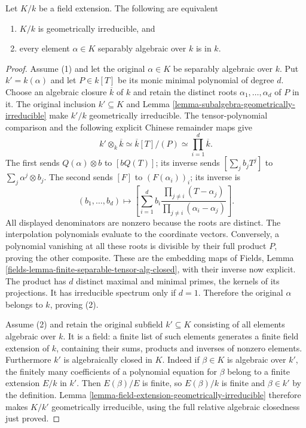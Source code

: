 \begin{lemma}
\label{lemma-geometrically-irreducible-separable-elements}
Let $K/k$ be a field extension. The following are equivalent
\begin{enumerate}
\item $K/k$ is geometrically irreducible, and
\item every element $\alpha \in K$ separably algebraic over $k$ is
in $k$.
\end{enumerate}
\end{lemma}

\begin{proof}
Assume (1) and let the original
$\alpha\in K$ be separably algebraic
over $k$. Put $k'=k(\alpha)$ and
let $P\in k[T]$ be its monic
minimal polynomial of degree $d$.
Choose an algebraic closure
$\overline k$ of $k$ and retain
the distinct roots
$\alpha_1,\ldots,\alpha_d$ of $P$
in it. The original inclusion
$k'\subseteq K$ and Lemma
\ref{lemma-subalgebra-geometrically-irreducible}
make $k'/k$ geometrically irreducible.
The tensor-polynomial comparison
and the following explicit Chinese
remainder maps give
$$
k'\otimes_k\overline k\simeq
\overline k[T]/(P)\simeq\prod_{i=1}^d\overline k.
$$
The first sends $Q(\alpha)\otimes b$
to $[bQ(T)]$; its inverse sends
$[\sum_j b_jT^j]$ to
$\sum_j\alpha^j\otimes b_j$.
The second sends $[F]$ to
$(F(\alpha_i))_i$; its inverse is
$$
(b_1,\ldots,b_d)\longmapsto
\left[\sum_{i=1}^d b_i
\frac{\prod_{j\ne i}(T-\alpha_j)}
{\prod_{j\ne i}(\alpha_i-\alpha_j)}\right].
$$
All displayed denominators are
nonzero because the roots are
distinct. The interpolation
polynomials evaluate to the
coordinate vectors. Conversely,
a polynomial vanishing at all
these roots is divisible by
their full product $P$, proving
the other composite. These are
the embedding maps of Fields,
Lemma
\ref{fields-lemma-finite-separable-tensor-alg-closed},
with their inverse now explicit.
The product has $d$ distinct
maximal and minimal primes,
the kernels of its projections.
It has irreducible spectrum
only if $d=1$. Therefore the
original $\alpha$ belongs to $k$,
proving (2).

Assume (2) and retain the original
subfield $k'\subseteq K$ consisting
of all elements algebraic over $k$.
It is a field: a finite list of
such elements generates a finite
field extension of $k$, containing
their sums, products and inverses
of nonzero elements. Furthermore
$k'$ is algebraically closed in
$K$. Indeed if $\beta\in K$ is
algebraic over $k'$, the finitely
many coefficients of a polynomial
equation for $\beta$ belong to a
finite extension $E/k$ in $k'$.
Then $E(\beta)/E$ is finite, so
$E(\beta)/k$ is finite and
$\beta\in k'$ by the definition.
Lemma
\ref{lemma-field-extension-geometrically-irreducible}
therefore makes $K/k'$ geometrically
irreducible, using the full relative
algebraic closedness just proved.


\end{proof}
